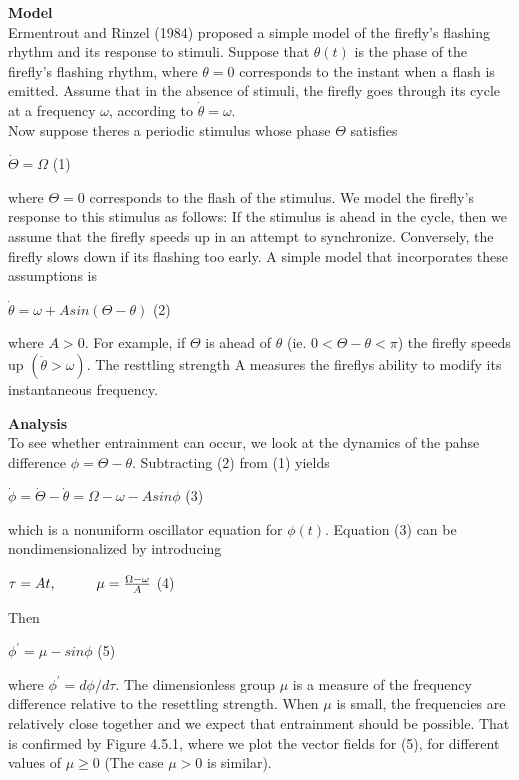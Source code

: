 \documentclass{article}
\newcommand\tab[1][1cm]{\hspace*{#1}}
\begin{document}
\textbf {Model}
\\ \tab Ermentrout and Rinzel (1984) proposed a simple model of the firefly's flashing rhythm and its response to stimuli. Suppose that $\theta(t)$ is the phase of the firefly's flashing rhythm, where $\theta=0$ corresponds to the instant when a flash is emitted. Assume that in the absence of stimuli, the firefly goes through its cycle at a frequency $\omega$, according to $\dot{\theta}=\omega$.
\\ \tab Now suppose theres a periodic stimulus whose phase $\Theta$ satisfies
\begin{center}
$\dot{\Theta}=\Omega$ \tab (1)
\end{center}
where $\Theta=0$ corresponds to the flash of the stimulus. We model the firefly's response to this stimulus as follows: If the stimulus is ahead in the cycle, then we assume that the firefly speeds up in an attempt to synchronize. Conversely, the firefly slows down if its flashing too early. A simple model that incorporates these assumptions is
\begin{center}
$\dot{\theta}=\omega+Asin(\Theta-\theta)$ \tab (2)
\end{center}
where $A>0$. For example, if $\Theta$ is ahead of $\theta$ (ie. $0<\Theta-\theta<\pi$) the firefly speeds up $(\dot{\theta}> \omega)$. The resttling strength A measures the fireflys ability to modify its instantaneous frequency.

\textbf {Analysis}
\\ \tab To see whether entrainment can occur, we look at the dynamics of the pahse difference $\phi=\Theta-\theta$. Subtracting (2) from (1) yields
\begin{center}
$\dot{\phi}=\dot{\Theta}-\dot{\theta}= \Omega-\omega-Asin\phi$ \tab (3)
\end{center}

which is a nonuniform oscillator equation for $\phi(t)$. Equation (3) can be nondimensionalized by introducing 
\begin{center}
$\tau=At, \tab \mu=\frac{\Omega-\omega}{A}$ \tab (4)
\end{center}

Then
\begin{center}
$\phi^{'}=\mu-sin\phi$ \tab (5)
\end{center}

where $\phi^{'}=d\phi/d\tau$. The dimensionless group $\mu$ is a measure of the frequency difference relative to the resettling strength. When $\mu$ is small, the frequencies are relatively close together and we expect that entrainment should be possible. That is confirmed by Figure 4.5.1, where we plot the vector fields for (5), for different values of $\mu \geq 0$ (The case $\mu >0$ is similar).
\end{document}
